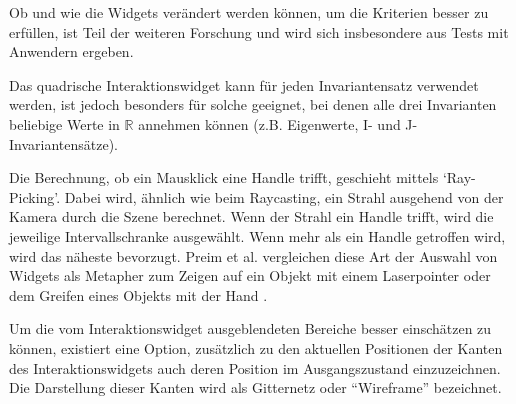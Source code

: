 \documentclass[a4paper,fontsize=12pt,toc=bib,halfparskip,ngerman]{scrartcl}
\begin{document}
Ob und wie die Widgets ver\"andert werden k\"onnen, um die Kriterien besser zu erf\"ullen, ist Teil der weiteren Forschung und wird sich insbesondere aus Tests mit Anwendern ergeben.

Das quadrische Interaktionswidget kann f\"ur jeden Invariantensatz verwendet werden, ist jedoch besonders f\"ur solche geeignet, bei denen alle drei Invarianten beliebige Werte in $\mathbb{R}$ annehmen k\"onnen (z.B. Eigenwerte, I- und J-Invariantens\"atze).

Die Berechnung, ob ein Mausklick eine Handle trifft, geschieht mittels `Ray-Picking'. Dabei wird, \"ahnlich wie beim Raycasting, ein Strahl ausgehend von der Kamera durch die Szene berechnet. Wenn der Strahl ein Handle trifft, wird die jeweilige Intervallschranke ausgew\"ahlt.  Wenn mehr als ein Handle getroffen wird, wird das n\"aheste bevorzugt. Preim et al. vergleichen diese Art der Auswahl von Widgets als Metapher zum Zeigen auf ein Objekt mit einem Laserpointer oder dem Greifen eines Objekts mit der Hand \cite[344]{preim2015interaktive}.

Um die vom Interaktionswidget ausgeblendeten Bereiche besser einsch\"atzen zu k\"onnen, existiert eine Option, zus\"atzlich zu den aktuellen Positionen der Kanten des Interaktionswidgets auch deren Position im Ausgangszustand einzuzeichnen. Die Darstellung dieser Kanten wird als Gitternetz oder ``Wireframe'' bezeichnet.
\end{document}
